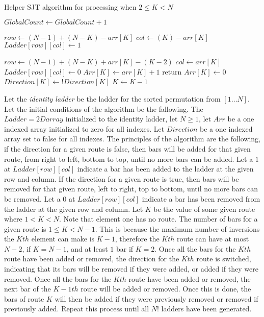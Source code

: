 \begin{algorithm}
  \caption{Helper SJT algorithm for processing when $2 \leq K < N$}
  \begin{algorithmic}[1]

        \State $GlobalCount \gets GlobalCount + 1$

            \State $row \gets (N-1) + (N-K) - arr[K]$
            \State $col \gets (K) - arr[K]$
            \State $Ladder[row][col] \gets 1$

          \Else
            \State $row \gets  (N-1) + (N-K) + arr[K] - (K-2)$
            \State $col \gets arr[K]$
            \State $Ladder[row][col] \gets 0$
          \EndIf
          \State $Arr[K]\gets arr[K]+1$
          \State return
        \Else 
          \State $Arr[K] \gets 0$
          \State $Direction[K] \gets !Direction[K]$
        \EndIf
        $K \gets K-1$
      \EndFor
      \EndFunction
  \end{algorithmic}
\end{algorithm}
\pagebreak

Let the \emph{identity ladder} be the ladder for the sorted permutation from $[1 \dots N]$.
Let the initial conditions of the algorithm be the fallowing. The $Ladder= 2D array$ initialized to the identity ladder,  
let $N \geq 1$, let $Arr$ be a one indexed array initialized to zero for all indexes. Let $Direction$ be a one 
indexed array set to false for all indexes. The principles of the algorithm are the following, if the direction for a 
given route is false, then bars will be added for that given route, from right to left, bottom to top, until no more bars can be added. Let a 
$1$ at $Ladder[row][col]$ indicate a bar has been added to the ladder at the given row and column.
If the direction for a given route is true, then bars will be removed for that given route, left to right, top to bottom, until 
no more bars can be removed. Let a $0$ at $Ladder[row][col]$ indicate a bar has been removed from the ladder 
at the given row and column. Let $K$ be the value of some given route where $1 < K < N$. Note that element one has no route.
The number of bars for a given route is $1 \leq K < N-1$. This is because the maximum number of inversions 
the $Kth$ element can make is $K-1$, therefore the $Kth$ route can have at most $N-2$, if $K=N-1$, and 
at least $1$ bar if $K=2$. Once all the bars for the $Kth$ route have been added 
or removed, the direction for the $Kth$ route is switched, indicating that its bars will be removed if they 
were added, or added if they were removed. Once all the bars for the $Kth$ route have been added or removed, 
the next bar of the $K-1th$ route will be added or removed. Once this is done, the bars of route $K$ will 
then be added if they were previously removed or removed if previously added. Repeat this process until all
$N!$ ladders have been generated.

